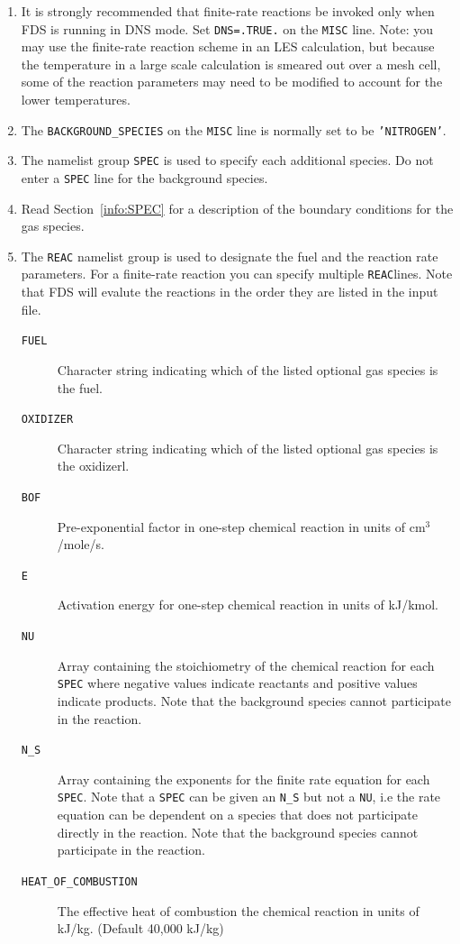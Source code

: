 \documentclass[11pt]{book}
\newcommand{\ct}{\tt\small}
\begin{document}
\begin{enumerate}
\item It is strongly recommended that finite-rate reactions be invoked only
when FDS is running in DNS mode. Set {\ct DNS=.TRUE.} on the {\ct MISC} line.
Note: you may use the finite-rate reaction scheme in an
LES calculation, but because the temperature in a large scale calculation
is smeared out over a mesh cell, some of the reaction parameters may need
to be modified to account for the lower temperatures.

\item The {\ct BACKGROUND\_SPECIES} on the {\ct MISC} line is normally
set to be {\ct 'NITROGEN'}.

\item The namelist group {\ct SPEC} is used to specify each additional
species. Do not enter a {\ct SPEC} line for the background species.

\item Read Section~\ref{info:SPEC} for a description of the boundary
conditions for the gas species.

\item The {\ct REAC} namelist group is used to designate the fuel and the reaction rate
parameters.  For a finite-rate reaction you can specify multiple {\ct REAC}lines.  Note that
FDS will evalute the reactions in the order they are listed in the input file. %
\begin{description}
\item[{\ct FUEL}] Character string indicating which of the listed
optional gas species is the fuel.
\item[{\ct OXIDIZER}] Character string indicating which of the listed
optional gas species is the oxidizerl.
\item[{\ct BOF}] Pre-exponential factor in one-step chemical reaction in
units of cm$^3$/mole/s.
\item[{\ct E}] Activation energy for one-step chemical reaction in
units of kJ/kmol.
\item[{\ct NU}] Array containing the stoichiometry of the chemical reaction for each {\ct SPEC} where
negative values indicate reactants and positive values indicate products.  Note that the background species
cannot participate in the reaction.
\item[{\ct N\_S}] Array containing the exponents for the finite rate equation for each {\ct SPEC}.
Note that a {\ct SPEC} can be given an {\ct N\_S} but not a {\ct NU}, i.e the rate equation can
be dependent on a species that does not participate directly in the reaction.  Note that the background species
cannot participate in the reaction.
\item[{\ct HEAT\_OF\_COMBUSTION}] The effective heat of combustion the chemical reaction in units of kJ/kg. (Default 40,000 kJ/kg)
\end{description}

\end{enumerate}
\end{document}
